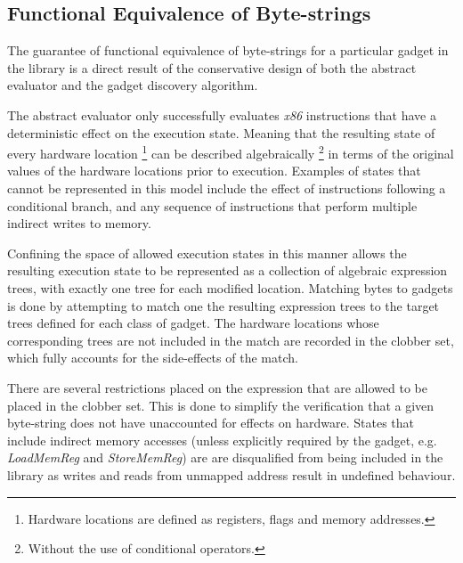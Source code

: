\documentclass[finalcopy,short]{srpaper}
\begin{document}
        \subsection{Functional Equivalence of Byte-strings}
        \label{sec:results-gadget-inst-eq}


            The guarantee of functional equivalence of byte-strings for a
            particular gadget in the library is a direct result of the
            conservative design of both the abstract evaluator and the gadget
            discovery algorithm.

            The abstract evaluator only successfully evaluates \emph{x86} instructions
            that have a deterministic effect on the execution state.  Meaning
            that the resulting state of every hardware location
            \footnote{Hardware locations are defined as registers, flags and
            memory addresses.} can be described algebraically \footnote{Without
            the use of conditional operators.} in terms of the original values
            of the hardware locations prior to execution. Examples of states
            that cannot be represented in this model include the effect of
            instructions following a conditional branch, and any sequence of
            instructions that perform multiple indirect writes to memory.

            Confining the space of allowed execution states in this manner
            allows the resulting execution state to be represented as a
            collection of algebraic expression trees, with exactly one tree for
            each modified location. Matching bytes to gadgets is done by
            attempting to match one the resulting expression trees to the target
            trees defined for each class of gadget. The hardware locations whose
            corresponding trees are not included in the match are recorded in
            the clobber set, which fully accounts for the side-effects of the
            match.

            There are several restrictions placed on the expression that are
            allowed to be placed in the clobber set. This is done to simplify
            the verification that a given byte-string does not have unaccounted
            for effects on hardware. States that include indirect memory
            accesses (unless explicitly required by the gadget, e.g.
            \emph{LoadMemReg} and \emph{StoreMemReg}) are are disqualified from
            being included in the library as writes and reads from unmapped
            address result in undefined behaviour.
            
\end{document}

